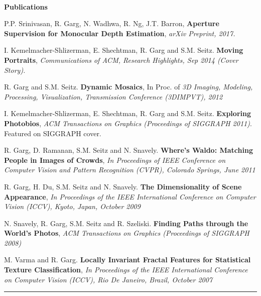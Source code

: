 \documentclass[10pt]{article}
\newenvironment{itemize*}%
  {\begin{itemize}%
    \setlength{\itemsep}{0pt}%
    \setlength{\parskip}{0pt}%
	}
  {\end{itemize}}
\begin{document}
\\
\vspace{0.10in}
{\large \textbf{Publications}}
\begin{itemize*}
\item P.P. Srinivasan, R. Garg, N. Wadhwa, R. Ng, J.T. Barron, \textbf{Aperture Supervision for Monocular Depth Estimation}, \emph{arXiv Preprint, 2017.}
\item I. Kemelmacher-Shlizerman, E. Shechtman, R. Garg and S.M. Seitz. \textbf{Moving Portraits}, \emph{Communications of ACM, Research Highlights, Sep 2014 (Cover Story).}
\item R. Garg and S.M. Seitz. \textbf{Dynamic Mosaics}, In Proc. of \emph{3D Imaging, Modeling, Processing, Visualization, Transmission Conference (3DIMPVT), 2012}
\item I. Kemelmacher-Shlizerman, E. Shechtman, R. Garg and S.M. Seitz. \textbf{Exploring Photobios}, \emph{ACM Transactions on Graphics (Proceedings of SIGGRAPH 2011)}. Featured on SIGGRAPH cover.
\item R. Garg, D. Ramanan, S.M. Seitz and N. Snavely. \textbf{Where's Waldo: Matching People in Images of Crowds}, \emph{In Proceedings of IEEE Conference on Computer Vision and Pattern Recognition (CVPR), Colorado Springs, June 2011}
\item R. Garg, H. Du, S.M. Seitz and N. Snavely. \textbf{The Dimensionality of Scene Appearance}, \emph{In Proceedings of the IEEE International Conference on Computer Vision (ICCV), Kyoto, Japan, October 2009}
\item N. Snavely, R. Garg, S.M. Seitz and R. Szeliski. \textbf{Finding Paths through the World's Photos}, \emph{ACM Transactions on Graphics (Proceedings of SIGGRAPH 2008)}
\item M. Varma and R. Garg. \textbf{Locally Invariant Fractal Features for Statistical Texture Classification}, \emph{In Proceedings of the IEEE International Conference on Computer Vision (ICCV), Rio De Janeiro, Brazil, October 2007} 
\end{itemize*}
\rule{6.5in}{2pt}
\end{document}
